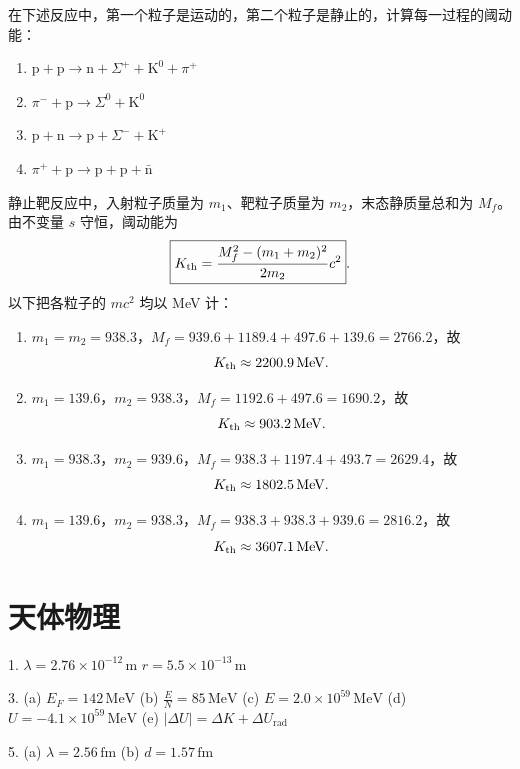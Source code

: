 \begin{exercise}\label{ex:30.16}
在下述反应中，第一个粒子是运动的，第二个粒子是静止的，计算每一过程的阈动能：
\begin{enumerate}
  \item[(a)] $\mathrm{p} + \mathrm{p} \rightarrow \mathrm{n} + \Sigma^+ + \mathrm{K}^0 + \pi^+$
  \item[(b)] $\pi^- + \mathrm{p} \rightarrow \Sigma^0 + \mathrm{K}^0$
  \item[(c)] $\mathrm{p} + \mathrm{n} \rightarrow \mathrm{p} + \Sigma^- + \mathrm{K}^+$
  \item[(d)] $\pi^+ + \mathrm{p} \rightarrow \mathrm{p} + \mathrm{p} + \bar{\mathrm{n}}$
\end{enumerate}
\end{exercise}
\begin{solution}
静止靶反应中，入射粒子质量为 $m_1$、靶粒子质量为 $m_2$，末态静质量总和为 $M_f$。由不变量 $s$ 守恒，阈动能为
\[
\boxed{K_{\rm th}=\frac{M_f^2-(m_1+m_2)^2}{2m_2}c^2}.
\]
以下把各粒子的 $mc^2$ 均以 MeV 计：
\begin{enumerate}
\item[(a)] $m_1=m_2=938.3$，$M_f=939.6+1189.4+497.6+139.6=2766.2$，故
\[
K_{\rm th}\approx2200.9\,\mathrm{MeV}.
\]
\item[(b)] $m_1=139.6$，$m_2=938.3$，$M_f=1192.6+497.6=1690.2$，故
\[
K_{\rm th}\approx903.2\,\mathrm{MeV}.
\]
\item[(c)] $m_1=938.3$，$m_2=939.6$，$M_f=938.3+1197.4+493.7=2629.4$，故
\[
K_{\rm th}\approx1802.5\,\mathrm{MeV}.
\]
\item[(d)] $m_1=139.6$，$m_2=938.3$，$M_f=938.3+938.3+939.6=2816.2$，故
\[
K_{\rm th}\approx3607.1\,\mathrm{MeV}.
\]
\end{enumerate}
\end{solution}



\chapter{天体物理}

\begin{oddanswers}
1. $\lambda = 2.76 \times 10^{-12}\,\mathrm{m}$
$r = 5.5 \times 10^{-13}\,\mathrm{m}$

3. (a) $E_F = 142\,\mathrm{MeV}$
(b) $\frac{E}{N} = 85\,\mathrm{MeV}$
(c) $E = 2.0 \times 10^{59}\,\mathrm{MeV}$
(d) $U = -4.1 \times 10^{59}\,\mathrm{MeV}$
(e) $|\Delta U| = \Delta K + \Delta U_{\text{rad}}$

5. (a) $\lambda = 2.56\,\mathrm{fm}$
(b) $d = 1.57\,\mathrm{fm}$
\end{oddanswers}

